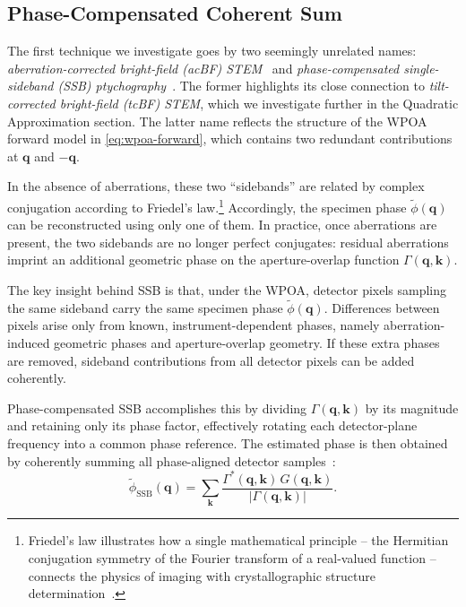 \documentclass[pdflatex,sn-aps,iicol]{sn-jnl}%
\begin{document}
\subsection{Phase-Compensated Coherent Sum}
\label{sec:ssb}

The first technique we investigate goes by two seemingly unrelated names: \emph{aberration-corrected bright-field (acBF) STEM}~\cite{Ma_2025} and \emph{phase-compensated single-sideband (SSB) ptychography}~\cite{Yang_2016}.
The former highlights its close connection to \emph{tilt-corrected bright-field (tcBF) STEM}, which we investigate further in the Quadratic Approximation section.
The latter name reflects the structure of the WPOA forward model in \cref{eq:wpoa-forward}, which contains two redundant contributions at $\boldsymbol{q}$ and $-\boldsymbol{q}$.

In the absence of aberrations, these two ``sidebands'' are related by complex conjugation according to Friedel's law.\footnote{Friedel's law illustrates how a single mathematical principle -- the Hermitian conjugation symmetry of the Fourier transform of a real-valued function -- connects the physics of imaging with crystallographic structure determination~\cite{Friedel_1913,karle1985}.}
Accordingly, the specimen phase $\tilde{\phi}(\boldsymbol{q})$ can be reconstructed using only one of them.
In practice, once aberrations are present, the two sidebands are no longer perfect conjugates: residual aberrations imprint an additional geometric phase on the aperture-overlap function $\Gamma(\boldsymbol{q},\boldsymbol{k})$.

The key insight behind SSB is that, under the WPOA, detector pixels sampling the same sideband carry the same specimen phase $\tilde{\phi}(\boldsymbol{q})$.
Differences between pixels arise only from known, instrument-dependent phases, namely aberration-induced geometric phases and aperture-overlap geometry.
If these extra phases are removed, sideband contributions from all detector pixels can be added coherently.

Phase-compensated SSB accomplishes this by dividing $\Gamma(\boldsymbol{q},\boldsymbol{k})$ by its magnitude and retaining only its phase factor, effectively rotating each detector-plane frequency into a common phase reference.
The estimated phase is then obtained by coherently summing all phase-aligned detector samples~\cite{Yang_2016}:
\begin{equation}
  \tilde{\phi}_{\text{SSB}}(\boldsymbol{q}) = \sum_{\boldsymbol{k}} \frac{\Gamma^{*}(\boldsymbol{q},\boldsymbol{k})\,G(\boldsymbol{q},\boldsymbol{k})} {\lvert \Gamma(\boldsymbol{q},\boldsymbol{k}) \rvert}.
  \label{eq:ssb-recon}
\end{equation}
\end{document}
